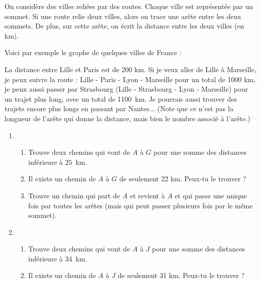 \documentclass[class=report,crop=false, 12pt]{standalone}
\begin{document}
\begin{activite}
On considère des villes reliées par des routes. Chaque ville est représentée par 
un sommet. Si une route relie deux villes, alors on trace une arête entre les deux sommets. De plus, sur cette arête, on écrit la distance entre les deux villes (en km).

Voici par exemple le graphe de quelques villes de France :




La distance entre Lille et Paris est de 200 km.
Si je veux aller de Lille à Marseille, je peux suivre la route :
Lille - Paris - Lyon - Marseille pour un total de 1000 km, 
je peux aussi passer par Strasbourg (Lille - Strasbourg - Lyon - Marseille) pour un trajet  plus long, avec un total de 1100~km. Je pourrais aussi trouver des trajets encore plus longs en passant par Nantes...
(Note que ce n'est pas la longueur de l'arête 
qui donne la distance, mais bien le nombre associé à l'arête.)

\begin{enumerate}
  \item	\sauteligne
  

  \begin{enumerate}
    \item Trouve deux chemins qui vont de $A$ à $G$ pour une somme des distances inférieure à $25$~km. 
    
    \item Il existe un chemin  de $A$ à $G$ de seulement 22 km. Peux-tu le trouver ?
  
    \item Trouve un chemin qui part de $A$ et revient à $A$ et qui passe une unique fois par toutes les arêtes (mais qui peut passer plusieurs fois par le même sommet).
  \end{enumerate}    

  \item \sauteligne
  

  \begin{enumerate}
    \item Trouve deux chemins qui vont de $A$ à $J$ pour une somme des distances inférieure à 34~km. 
    
    \item Il existe un chemin  de $A$ à $J$ de seulement 31 km. Peux-tu le trouver ?
  

\end{enumerate}
\end{enumerate}
\end{activite}
\end{document}
